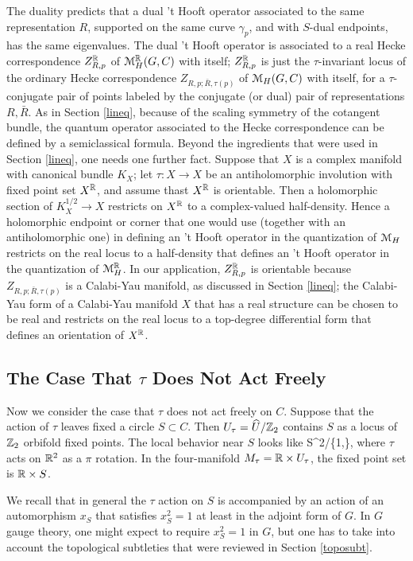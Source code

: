 \documentclass[11pt,a4paper]{article}
\begin{document}
The duality predicts that a dual 't Hooft operator associated to the same representation $R$, supported on the same curve 
$\gamma_p$, and with $S$-dual endpoints, has the same eigenvalues.   The dual 't Hooft operator is associated to a real Hecke correspondence $Z^{\mathbb{R}}_{R,p}$ of ${\mathcal M}_H^{\mathbb{R}}(G,C)$ with itself;
$Z^{\mathbb{R}}_{R,p}$ is just the $\tau$-invariant locus of the ordinary Hecke correspondence $Z_{R,p;\bar R,\tau(p)}$  of ${\mathcal M}_H(G,C)$ with itself, 
for a $\tau$-conjugate pair of points labeled by the conjugate (or dual) 
pair of representations $R,\bar R$.   
As in Section \ref{lineq}, because of the scaling symmetry of the cotangent bundle, the quantum operator associated to the
Hecke correspondence can be defined by a semiclassical formula.   Beyond the ingredients that were used in Section \ref{lineq}, one needs one further
fact.  Suppose that $X$ is a complex manifold with canonical bundle $K_X$; let $\tau:X\to X$ be an antiholomorphic involution  with fixed point set $X^{\mathbb{R}}$,
and assume thast $X^{\mathbb{R}}$ is orientable.
Then a holomorphic section of $K_X^{1/2}\to X$ restricts on $X^{\mathbb{R}}$ to a complex-valued half-density.   Hence a holomorphic endpoint or corner that one
would use (together with an antiholomorphic one) 
in defining an 't Hooft operator in the quantization of ${\mathcal M}_H$ restricts on the real locus to a half-density that defines an 't Hooft
operator in the quantization of ${\mathcal M}_H^{\mathbb{R}}$.   In our application, $Z^{\mathbb{R}}_{R,p}$ is orientable because $Z_{R,p;\bar R,\tau(p)}$ is a Calabi-Yau manifold,
as discussed in Section \ref{lineq}; the Calabi-Yau form of a Calabi-Yau manifold $X$ that has a real structure can be chosen to be real and restricts
on the real locus to a top-degree differential form that defines an orientation of $X^{\mathbb{R}}$.



\subsection{The Case That $\tau$ Does Not Act Freely}\label{nonfree}

Now we consider  the case that $\tau$ does not act freely on $C$.      Suppose that the action of $\tau$ leaves fixed a circle $S\subset C$.
Then $U_\tau=\widehat U/{\mathbb Z}_2$ contains $S$ as a locus of ${\mathbb Z}_2$ orbifold fixed points.    The local behavior near $S$ looks like
\be\label{wofo} S\times \R^2/\{1,\tau\}, \ee
where $\tau$ acts on ${\mathbb{R}}^2$ as a $\pi$ rotation.
  In the four-manifold $M_\tau={\mathbb{R}}\times U_\tau$,
the fixed point set is ${\mathbb{R}}\times S$. 

We recall that in general the $\tau$ action on $S$ is accompanied by an action of an automorphism $x_S$ that satisfies $x_S^2=1$ at least
in the adjoint form of $G$.    In $G$ gauge theory, one might expect to require $x_S^2=1$ in $G$, but one has to take into account
the topological subtleties that were reviewed in Section \ref{toposubt}.    
\end{document}
